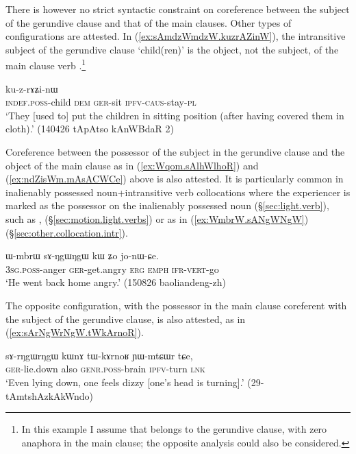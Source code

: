 There is however no strict syntactic constraint on coreference between the subject of the gerundive clause and that of the main clauses. Other types of configurations are attested. In (\ref{ex:sAmdzWmdzW.kuzrAZinW}), the intransitive subject of the gerundive clause  `child(ren)' is the object, not the subject, of the main clause verb .\footnote{In this example I assume that  belongs to the gerundive clause, with zero anaphora in the main clause; the opposite analysis could also be considered.}

\begin{exe}
\ex \label{ex:sAmdzWmdzW.kuzrAZinW}
 ku-z-rɤʑi-nɯ \\
\textsc{indef}.\textsc{poss}-child \textsc{dem} \textsc{ger}-sit \textsc{ipfv}-\textsc{caus}-stay-\textsc{pl} \\
\glt `They [used to] put the children in sitting position (after having covered them in cloth).' (140426 tApAtso kAnWBdaR 2)
\end{exe}

Coreference between the possessor of the subject in the gerundive clause and the object of the main clause as in (\ref{ex:Wqom.sAlhWlhoR}) and (\ref{ex:ndZisWm.mAsACWCe}) above is also attested. It is particularly common in inalienably possessed noun+intransitive verb collocations where the experiencer is marked as the possessor on the inalienably possessed noun (§\ref{sec:light.verb}), such as ,  (§\ref{sec:motion.light.verbs}) or  as in (\ref{ex:WmbrW.sANgWNgW}) (§\ref{sec:other.collocation.intr}).

\begin{exe}
\ex \label{ex:WmbrW.sANgWNgW}
\gll ɯ-mbrɯ sɤ-ŋgɯ\redp{}ŋgɯ kɯ ʑo jo-nɯ-ɕe. \\
\textsc{3sg}.\textsc{poss}-anger \textsc{ger}-get.angry \textsc{erg} \textsc{emph} \textsc{ifr}-\textsc{vert}-go \\
\glt `He went back home angry.' (150826 baoliandeng-zh) 
\end{exe}

The opposite configuration, with the possessor in the main clause coreferent with the subject of the gerundive clause, is also attested, as in (\ref{ex:sArNgWrNgW.tWkArnoR}).

\begin{exe}
\ex \label{ex:sArNgWrNgW.tWkArnoR}
\gll  sɤ-rŋgɯ\redp{}rŋgɯ kɯnɤ tɯ-kɤrnoʁ ɲɯ-mtɕɯr tɕe, \\
\textsc{ger}-lie.down also \textsc{genr}.\textsc{poss}-brain \textsc{ipfv}-turn \textsc{lnk} \\
\glt `Even lying down, one feels dizzy [one's head is turning].' (29-tAmtshAzkAkWndo) 
\end{exe}

